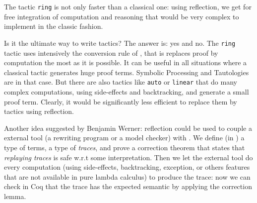The tactic \texttt{ring} is not only faster than a classical one:
using reflection, we get for free integration of computation and
reasoning that would be very complex to implement in the classic fashion.

Is it the ultimate way to write tactics?  The answer is: yes and
no. The \texttt{ring} tactic uses intensively the conversion rule of
\CIC, that is replaces proof by computation the most as it is
possible. It can be useful in all situations where a classical tactic
generates huge proof terms. Symbolic Processing and Tautologies are in
that case. But there are also tactics like \texttt{auto} or
\texttt{linear} that do many complex computations, using side-effects
and backtracking, and generate a small proof term. Clearly, it would
be significantly less efficient to replace them by tactics using
reflection.

Another idea suggested by Benjamin Werner: reflection could be used to
couple a external tool (a rewriting program or a model checker) with
\Coq. We define (in \Coq) a type of terms, a type of \emph{traces},
and prove a correction theorem that states that \emph{replaying
traces} is safe w.r.t some interpretation. Then we let the external
tool do every computation (using side-effects, backtracking,
exception, or others features that are not available in pure lambda
calculus) to produce the trace: now we can check in Coq{} that the
trace has the expected semantic by applying the correction lemma.
 
